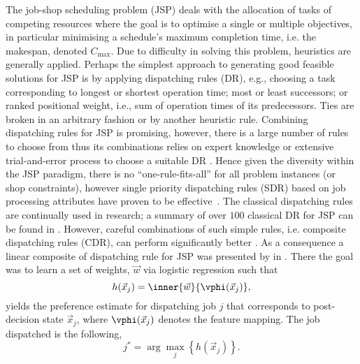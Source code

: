 \documentclass{acm_proc_article-sp}
\begin{document}
The job-shop scheduling problem (JSP) deals with the allocation of tasks of competing resources where the goal is to optimise a single or multiple objectives, in particular minimising a schedule's maximum completion time, i.e. the makespan, denoted $C_{\max}$. Due to difficulty in solving this problem, heuristics are generally applied. Perhaps the simplest approach to generating good feasible solutions for JSP is by applying dispatching rules (DR),  e.g., choosing a task corresponding to longest or shortest operation time; most or least successors; or ranked positional weight, i.e., sum of operation times of its predecessors. Ties are broken in an arbitrary fashion or by another heuristic rule. Combining dispatching rules for JSP is promising, however, there is a large number of rules to choose from thus its combinations relies on expert knowledge or extensive trial-and-error process to choose a suitable DR \cite{Tay08}. Hence given the diversity within the JSP paradigm, there is no ``one-rule-fits-all'' for all problem instances (or shop constraints), however single priority dispatching rules (SDR) based on job processing attributes have proven to be effective~\cite{Haupt89}. 
The classical dispatching rules are continually used in research; a summary of over $100$ classical DR for JSP can be found in \cite{Panwalkar77}. 
However, careful combinations of such simple rules, i.e. composite dispatching rules (CDR), can perform significantly better \cite{Jayamohan04}. 
As a consequence a linear composite of dispatching rule for JSP was presented by in \cite{InRu11a}. There the goal was to learn a set of weights, $\vec{w}$ via logistic regression such that 
\begin{equation}\label{eq:jssp:linweights}
h(\vec{x}_j)=\inner{\vec{w}}{\vphi(\vec{x}_j)},
\end{equation}
yields the preference estimate for dispatching job $j$ that corresponds to post-decision state $\vec{x}_j$, where $\vphi(\vec{x}_j)$ denotes the feature mapping. The job dispatched is the following, 
\begin{equation}\label{eq:jstar}
j^* = \arg\max_j\left\{h(\vec{x}_j)\right\}. 
\end{equation}

 
\end{document}
